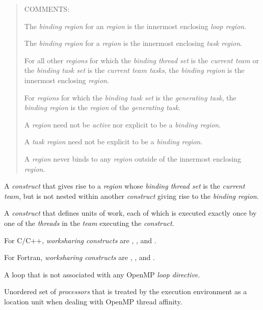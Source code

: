 \begin{quote}
COMMENTS: 

The \emph{binding region} for an  \emph{region} is the innermost enclosing 
\emph{loop region}.

The \emph{binding region} for a  \emph{region} is the innermost enclosing 
\emph{task region}.

For all other \emph{regions} for which the \emph{binding thread set} is the \emph{current
team} or the \emph{binding task set} is the \emph{current team tasks}, the \emph{binding 
region} is the innermost enclosing  \emph{region}.

For \emph{regions} for which the \emph{binding task set} is the \emph{generating task}, the 
\emph{binding region} is the \emph{region} of the \emph{generating task}.

A  \emph{region} need not be \emph{active} nor explicit to be a \emph{binding region}.

A \emph{task region} need not be explicit to be a \emph{binding region}.

A \emph{region} never binds to any \emph{region} outside of the innermost enclosing 
 \emph{region}.
\end{quote}
\glossarydefend

\glossarydefstart
A \emph{construct} that gives rise to a \emph{region} whose \emph{binding thread set} is the \emph{current 
team}, but is not nested within another \emph{construct} giving rise to the \emph{binding region}.
\glossarydefend

\glossarydefstart
A \emph{construct} that defines units of work, each of which is executed exactly once by 
one of the \emph{threads} in the \emph{team} executing the \emph{construct}.

For C/C++, \emph{worksharing constructs} are , , and .

For Fortran, \emph{worksharing constructs} are , ,  and 
.
\glossarydefend

\glossarydefstart
A loop that is not associated with any OpenMP \emph{loop directive}.
\glossarydefend

\glossarydefstart
Unordered set of \emph{processors} that is treated by the execution environment as a 
location unit when dealing with OpenMP thread affinity.
\glossarydefend

